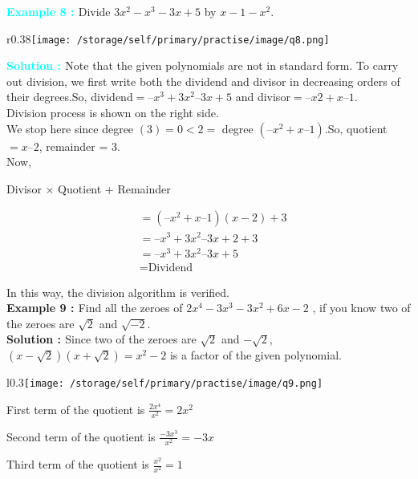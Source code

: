 \documentclass{article} %
\begin{document}
\vspace*{2em}



\noindent\textbf{\textcolor{cyan}{Example 8 : }}Divide $3x^2 - x^3 -3x  + 5 $ by $x - 1 - x^2.$

\begin{wrapfigure}{r}{0.38\textwidth}\texttt{[image: /storage/self/primary/practise/image/q8.png]}
\label{}
\end{wrapfigure}

\noindent\textbf{\textcolor{cyan}{Solution : }}  Note that the given polynomials are not in standard form. To carry out division, we first write both the dividend and divisor in decreasing orders of their degrees.So, dividend$ = –x^3 + 3x^2 – 3x + 5 $ and divisor$ = –x2 + x – 1$.\\
Division process is shown on the right side.\\
We stop here since degree $(3) = 0 < 2 = $ degree $(–x^2 + x – 1)$.So, quotient$ = x – 2$, remainder = 3.\\
Now,

\begin{center}
Divisor $\times$  Quotient + Remainder
\end{center}


\vspace{-1cm}

\begin{align*}
  &=  (–x^2 + x – 1)(x-2) + 3\\
  &= –x^3 + 3x^2 – 3x + 2 + 3\\
  &= –x^3 + 3x^2 – 3x + 5\\
  &= \text{Dividend} 
\end{align*}

\noindent In this way, the division algorithm is verified.\\





\noindent\textbf{\textcolor[rgb]{0,0.502,0.753}{Example 9 : }}Find all the zeroes of $2x^4 - 3x^3 - 3x^2 + 6x - 2 $ , if you know two of the zeroes are $\sqrt{2}$ and $\sqrt{-2}$.\\
\noindent\textbf{\textcolor[rgb]{0,0.502,0.753}{Solution : }} Since two of the zeroes are $\sqrt{2}$ and $-\sqrt{2}$, $(x - \sqrt{2})(x + \sqrt{2}) = x^2 - 2$ is a factor of the given polynomial.
\\

\begin{wrapfigure}{l}{0.3\textwidth}\texttt{[image: /storage/self/primary/practise/image/q9.png]}
\label{}
\end{wrapfigure}

\noindent First term of the quotient is $\frac{2x^4}{x^2}=2x^2$

\vspace{2em}
\noindent Second term of the quotient is $\frac{-3x^3}{x^2}=-3x$

\vspace{2em}
\noindent Third term of the quotient is $\frac{x^2}{x^2}=1$
\\
\end{document}
